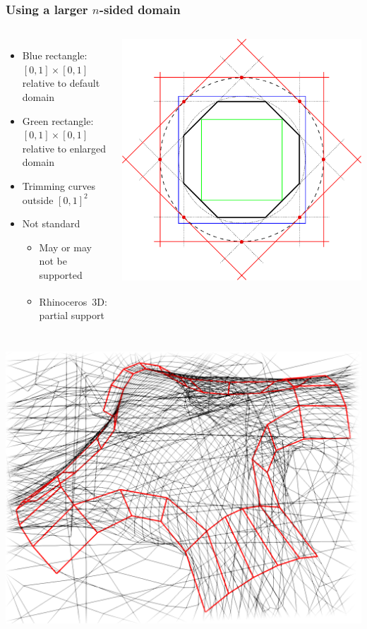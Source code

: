 \documentclass[xcolor=table]{beamer}
\begin{document}
\begin{frame}
  \frametitle{Using a larger $n$-sided domain}
  \begin{columns}
    \begin{itemize}
    \item Blue rectangle: $[0,1]\times[0,1]$\\relative to default domain
    \item Green rectangle: $[0,1]\times[0,1]$\\relative to enlarged domain
    \item Trimming curves outside $[0,1]^2$
    \item Not standard
      \begin{itemize}
      \item May or may not be supported
      \item Rhinoceros\textsuperscript\textregistered\ 3D: partial support
      \end{itemize}
    \end{itemize}
    \includegraphics[width=\textwidth]{images/singularities2.pdf}
  \end{columns}
  \vfill
  \includegraphics[width=.33\textwidth]{images/8sided-1.png}

\end{frame}
\end{document}
